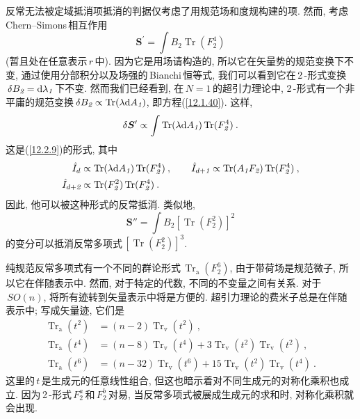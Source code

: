 反常无法被定域抵消项抵消的判据仅考虑了用规范场和度规构建的项. 然而, 考虑\,Chern--Simons\,相互作用
\begin{equation}
    \bm{S}^{\prime} = \int B_{\textit{2}} \operatorname{Tr}(F_{\textit{2}}^{4}) \label{12.2.15}
\end{equation}
(暂且处在任意表示$\,r\,$中). 因为它是用场请构造的, 所以它在矢量势的规范变换下不变, 通过使用分部积分以及场强的\,Bianchi\,恒等式, 我们可以看到它在\,2\,-形式变换$\,\delta B_{\textit{2}}=\mathrm{d} \lambda_{\textit{1}}\,$下不变. 然而我们已经看到, 在$\,N=1\,$的超引力理论中, 2\,-形式有一个非平庸的规范变换$\,\delta B_{\textit{2}}\propto \operatorname{Tr}(\lambda \mathrm{d} A_{\textit{1}})$, 即方程(\ref{12.1.40}). 这样,
\begin{equation}
    \delta \bm{S}'\propto\int \operatorname{Tr}(\lambda \mathrm{d} A_{\textit{1}})\operatorname{Tr}(F_{\textit{2}}^{4}) \:. \label{12.2.16}
\end{equation}
这是(\ref{12.2.9})的形式, 其中
\begin{subequations} \label{12.2.17}
    \begin{align}
        \hat{I}_{d} &\propto \operatorname{Tr}(\lambda \mathrm{d} A_{\textit{1}})\operatorname{Tr}(F_{\textit{2}}^{4}) \:, \qquad 
        \hat{I}_{d+\textit{1}}\propto\operatorname{Tr}(A_{\textit{1}}F_{\textit{2}})\operatorname{Tr}(F_{\textit{2}}^{4}) \:, \label{12.2.17a} \\
        \hat{I}_{d+\textit{2}} &\propto\operatorname{Tr}(F_{\textit{2}}^{2})\operatorname{Tr}(F_{\textit{2}}^{4}) \:. \label{12.2.17b}
    \end{align}
\end{subequations}
因此, 他可以被这种形式的反常抵消. 类似地, 
\begin{equation}
    \bm{S}''=\int B_{\textit{2}} [\operatorname{Tr}(F_{\textit{2}}^{2})]^{2} \label{12.2.18}
\end{equation}
的变分可以抵消反常多项式$\,[\operatorname{Tr}(F_{\textit{2}}^{2})]^{3}$. 

纯规范反常多项式有一个不同的群论形式$\,\operatorname{Tr}_{\text{a}}(F_{\textit{2}}^{6})$, 由于带荷场是规范微子, 所以它在伴随表示中. 然而, 对于特定的代数, 不同的不变量之间有关系. 对于$\,SO(n)$, 将所有迹转到矢量表示中将是方便的. 超引力理论的费米子总是在伴随表示中; 写成矢量迹, 它们是
\begin{subequations} \label{12.2.19}
\begin{align}
    \operatorname{Tr}_{\text{a}}(t^{2}) &= (n-2) \operatorname{Tr}_{\text{v}}(t^{2}) \:, \label{12.2.19a} \\
    \operatorname{Tr}_{\text{a}}(t^{4}) &= (n-8) \operatorname{Tr}_{\text{v}}(t^{4}) +3\operatorname{Tr}_{\text{v}}(t^{2})\operatorname{Tr}_{\text{v}}(t^{2}) \:, \label{12.2.19b} \\
    \operatorname{Tr}_{\text{a}}(t^{6}) &= (n-32) \operatorname{Tr}_{\text{v}}(t^{6}) +15\operatorname{Tr}_{\text{v}}(t^{2})\operatorname{Tr}_{\text{v}}(t^{4}) \:. \label{12.2.19c}
\end{align}
\end{subequations} 
这里的$\,t\,$是生成元的任意线性组合, 但这也暗示着对不同生成元的对称化乘积也成立. 因为\,2\,-形式$\,F_{\textit{2}}^{a}\,$和$\,F_{\textit{2}}^{b}\,$对易, 当反常多项式被展成生成元的求和时, 对称化乘积就会出现.

